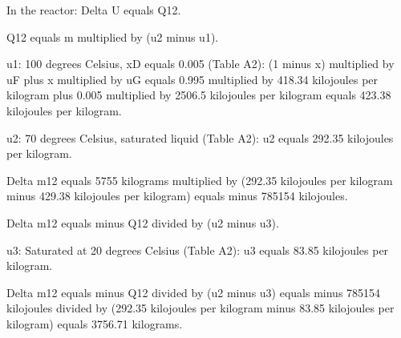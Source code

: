 In the reactor:  
Delta U equals Q12.  

Q12 equals m multiplied by (u2 minus u1).  

u1:  
100 degrees Celsius, xD equals 0.005 (Table A2):  
(1 minus x) multiplied by uF plus x multiplied by uG  
equals 0.995 multiplied by 418.34 kilojoules per kilogram plus 0.005 multiplied by 2506.5 kilojoules per kilogram  
equals 423.38 kilojoules per kilogram.  

u2:  
70 degrees Celsius, saturated liquid (Table A2):  
u2 equals 292.35 kilojoules per kilogram.  

Delta m12 equals 5755 kilograms multiplied by (292.35 kilojoules per kilogram minus 429.38 kilojoules per kilogram)  
equals minus 785154 kilojoules.  

Delta m12 equals minus Q12 divided by (u2 minus u3).  

u3:  
Saturated at 20 degrees Celsius (Table A2):  
u3 equals 83.85 kilojoules per kilogram.  

Delta m12 equals minus Q12 divided by (u2 minus u3)  
equals minus 785154 kilojoules divided by (292.35 kilojoules per kilogram minus 83.85 kilojoules per kilogram)  
equals 3756.71 kilograms.